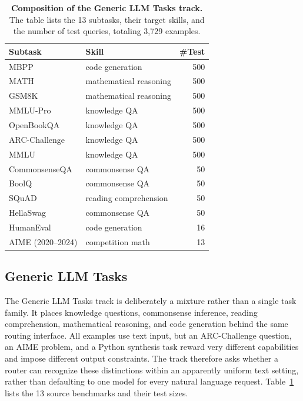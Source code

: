 \begin{table}[h]
\centering
\caption{\textbf{Composition of the Generic LLM Tasks track.} The table lists the 13 subtasks, their target skills, and the number of test queries, totaling 3{,}729 examples.}
\label{tab:app-classic}
\small
\setlength{\tabcolsep}{6pt}
\begin{tabular}{llr}
\toprule
\textbf{Subtask} & \textbf{Skill} & \textbf{\#Test} \\
\midrule
MBPP & code generation & 500 \\
MATH & mathematical reasoning & 500 \\
GSM8K & mathematical reasoning & 500 \\
MMLU-Pro & knowledge QA & 500 \\
OpenBookQA & knowledge QA & 500 \\
ARC-Challenge & knowledge QA & 500 \\
MMLU & knowledge QA & 500 \\
CommonsenseQA & commonsense QA & 50 \\
BoolQ & commonsense QA & 50 \\
SQuAD & reading comprehension & 50 \\
HellaSwag & commonsense QA & 50 \\
HumanEval & code generation & 16 \\
AIME (2020--2024) & competition math & 13 \\
\bottomrule
\end{tabular}
\end{table}

\subsection{Generic LLM Tasks} \label{app:general_nlp}

The Generic LLM Tasks track is deliberately a mixture rather than a single task family. It places knowledge questions, commonsense inference, reading comprehension, mathematical reasoning, and code generation behind the same routing interface. All examples use text input, but an ARC-Challenge question, an AIME problem, and a Python synthesis task reward very different capabilities and impose different output constraints. The track therefore asks whether a router can recognize these distinctions within an apparently uniform text setting, rather than defaulting to one model for every natural language request. Table~\ref{tab:app-classic} lists the 13 source benchmarks and their test sizes.

